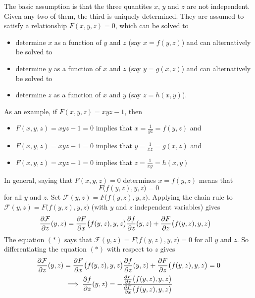 \begin{solution}
 The basic assumption is that the three quantites $x$, $y$
and $z$ are not independent. Given any two of them, the third is uniquely
determined. They are assumed to satisfy a relationship
$F(x,y,z)=0$, which can be solved to
\begin{itemize}\itemsep1pt \parskip0pt  %
\item
determine $x$ as a function of $y$ and $z$ (say $x=f(y,z)$) and 
can alternatively be solved to
\item
determine $y$ as a function of $x$ and $z$ (say $y=g(x,z)$) and 
can alternatively be solved to
\item
determine $z$ as a function of $x$ and $y$
(say $z=h(x,y)$). 
\end{itemize}
As an example, if $F(x,y,z) = xyz-1$, then 
\begin{itemize}\itemsep1pt \parskip0pt  %
\item
$F(x,y,z)=xyz-1=0$ implies that $x=\frac{1}{yz}=f(y,z)$ and
\item
$F(x,y,z)=xyz-1=0$ implies that $y=\frac{1}{xz}=g(x,z)$ and
\item
$F(x,y,z)=xyz-1=0$ implies that $z=\frac{1}{xy}=h(x,y)$
\end{itemize}
In general, saying that  $F(x,y,z)=0$ determines $x=f(y,z)$ means that 
\begin{equation*}
F\big(f(y,z),y,z\big)=0
\tag{$*$}
\end{equation*}
for all $y$ and $z$. 
Set $\mathcal{F}(y,z)=F\big(f(y,z),y,z\big)$. Applying the chain rule to
$\mathcal{F}(y,z)=F\big(f(y,z),y,z\big)$ (with $y$ and $z$ independent variables) 
gives
\begin{align*}
\pdiff{\mathcal{F}}{z}(y,z) 
&= 
\pdiff{F}{x}\big(f(y,z),y,z\big)
\pdiff{f}{z}(y,z)
+\pdiff{F}{z}\big(f(y,z),y,z\big)
\end{align*}
The equation $(*)$ says that $\mathcal{F}(y,z)=F\big(f(y,z),y,z\big)=0$ 
for all $y$ and $z$.
So differentiating the equation $(*)$ with respect to 
$z$ gives
\begin{align*}
\pdiff{\mathcal{F}}{z}(y,z)&=\pdiff{F}{x}\big(f(y,z),y,z\big)
\pdiff{f}{z}(y,z)
+\pdiff{F}{z}\big(f(y,z),y,z\big)=0 \\
&\implies
\pdiff{f}{z}(y,z)
=-\frac{\pdiff{F}{z}\big(f(y,z),y,z\big)}
{\pdiff{F}{x}\big(f(y,z),y,z\big)}

\end{align*}
\end{solution}
